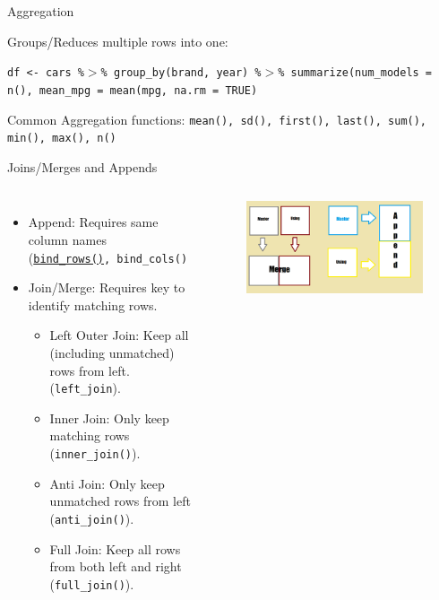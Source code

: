 \documentclass[12pt,aspectratio=169]{beamer}
\newenvironment{wideitemize}{\itemize\addtolength{\itemsep}{10pt}}{\enditemize}
\begin{document}
\begin{frame}{Aggregation}
    \begin{wideitemize}
        \item Groups/Reduces multiple rows into one:
        \item \texttt{df <- cars \%$>$\% group\_by(brand, year) \%$>$\% summarize(num\_models = n(), mean\_mpg = mean(mpg, na.rm = TRUE)}
        \item Common Aggregation functions: \texttt{mean(), sd(), first(), last(), sum(), min(), max(), n()}
    \end{wideitemize}
\end{frame}

\begin{frame}{Joins/Merges and Appends}
  \begin{columns}[c]
        \begin{itemize}
            \item Append: Requires same column names (\texttt{\href{https://dplyr.tidyverse.org/reference/bind.html}{bind\_rows()}, bind\_cols()}
            \item Join/Merge: Requires key to identify matching rows.
            \begin{itemize}
                \item Left Outer Join: Keep all (including unmatched) rows from left. (\texttt{left\_join}).
                \item Inner Join: Only keep matching rows (\texttt{inner\_join()}).
                \item Anti Join: Only keep unmatched rows from left (\texttt{anti\_join()}).
                \item Full Join: Keep all rows from both left and right (\texttt{full\_join()}).
            \end{itemize}
        \end{itemize}
        \begin{figure}
        \centering
        \includegraphics[width=1.0\linewidth,height=0.6\textheight,keepaspectratio]{resources/merge_append_data.png}
        \end{figure}
    \end{columns}
\end{frame}
\end{document}
